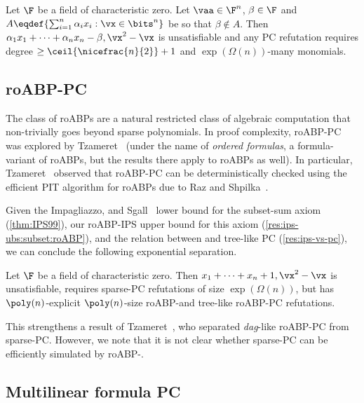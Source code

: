 \documentclass{toc}
\begin{document}
\begin{theoremwp}\label{thm:IPS99}
        Let $\F$ be a field of characteristic zero. Let $\vaa\in\F^n$, $\beta\in\F$ and $A\eqdef\{\sum_{i=1}^n \alpha_i x_i : \vx\in\bits^n\}$ be so that $\beta\notin A$. Then $\alpha_1x_1+\cdots+\alpha_nx_n-\beta,\vx^2-\vx$ is unsatisfiable and any PC refutation requires degree $\ge\ceil{\nicefrac{n}{2}}+1$ and $\exp(\Omega(n))$-many monomials.
\end{theoremwp}

\subsection{roABP-PC}

The class of roABPs are a natural restricted class of algebraic computation that non-trivially goes beyond sparse polynomials.  In proof complexity, roABP-PC was explored by Tzameret~\cite{Tzameret11} (under the name of \emph{ordered formulas}, a formula-variant of roABPs, but the results there apply to roABPs as well).  In particular, Tzameret~\cite{Tzameret11} observed that roABP-PC can be deterministically checked using the efficient PIT algorithm for roABPs due to Raz and Shpilka~\cite{RazShpilka05}.

Given the Impagliazzo, \Pudlak and Sgall~\cite{IPS99} lower bound for the subset-sum axiom (\autoref{thm:IPS99}), our roABP-IPS upper bound for this axiom (\autoref{res:ips-ubs:subset:roABP}), and the relation between \lIPS and tree-like PC (\autoref{res:ips-vs-pc}), we can conclude the following exponential separation.

\begin{corollarywp}
        Let $\F$ be a field of characteristic zero. Then $x_1+\cdots+x_n+1,\vx^2-\vx$ is unsatisfiable, requires sparse-PC refutations of
%
size $\exp(\Omega(n))$,    %
but has $\poly(n)$-explicit $\poly(n)$-size roABP-\lIPS and tree-like roABP-PC refutations.
\end{corollarywp}

This strengthens a result of Tzameret~\cite{Tzameret11}, who separated \emph{dag}-like roABP-PC from sparse-PC\@. However, we note that it is not clear whether sparse-PC can be efficiently simulated by roABP-\lIPS.

\subsection{Multilinear formula PC}
\end{document}
